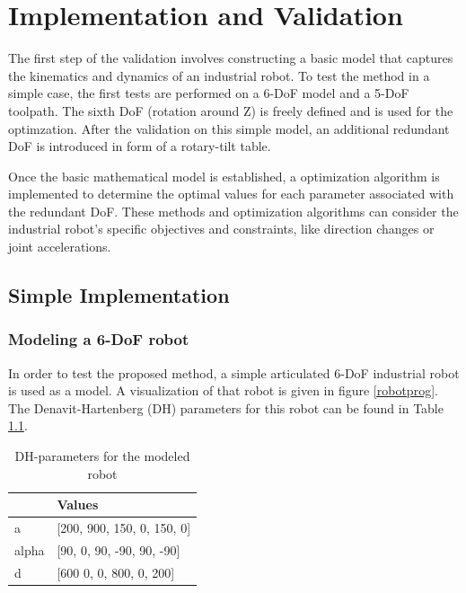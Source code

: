 \chapter{Implementation and Validation}%

The first step of the validation involves constructing a basic model that captures the kinematics and dynamics of an industrial robot. To test the method in a simple case, the first tests are performed on a 6-DoF model and a 5-DoF toolpath. The sixth DoF (rotation around Z) is freely defined and is used for the optimzation. After the validation on this simple model, an additional redundant DoF is introduced in form of a rotary-tilt table. 

Once the basic mathematical model is established, a optimization algorithm is implemented to determine the optimal values for each parameter associated with the redundant DoF. These methods and optimization algorithms can consider the industrial robot's specific objectives and constraints, like direction changes or joint accelerations. 



\section{Simple Implementation}%
\subsection{Modeling a 6-DoF robot}
In order to test the proposed method, a simple articulated 6-DoF industrial robot is used as a model. A visualization of that robot is given in figure \ref{robotprog}. The Denavit-Hartenberg (DH) parameters for this robot can be found in Table \ref{DH}.

\begin{table}[H]
	\centering
	\begin{tabular}{||l|l||}
		  & Values \\
		\hline
		\hline
		\hline
		a	&		[200, 900, 150, 0,   150, 0] \\
		alpha	&  	[90,  0,   90,  -90, 90,  -90] \\
		d	& 		[600  0,   0,   800, 0,   200]\\
		
		\hline
		\hline
	\end{tabular}
	
	\caption{DH-parameters for the modeled robot}
	\label{DH}
\end{table}


